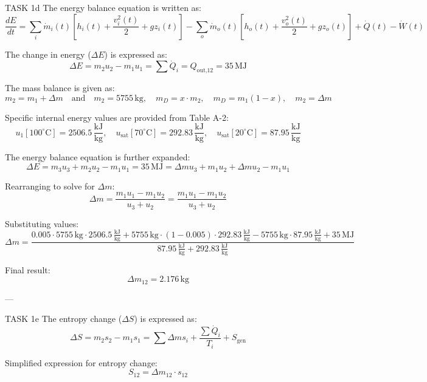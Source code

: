 TASK 1d  
The energy balance equation is written as:  
\[
\frac{dE}{dt} = \sum_i \dot{m}_i(t) \left[ h_i(t) + \frac{v_i^2(t)}{2} + g z_i(t) \right] - \sum_o \dot{m}_o(t) \left[ h_o(t) + \frac{v_o^2(t)}{2} + g z_o(t) \right] + \dot{Q}(t) - \dot{W}(t)
\]  

The change in energy (\( \Delta E \)) is expressed as:  
\[
\Delta E = m_2 u_2 - m_1 u_1 = \sum \dot{Q}_i = Q_{\text{out,12}} = 35 \, \text{MJ}
\]  

The mass balance is given as:  
\[
m_2 = m_1 + \Delta m \quad \text{and} \quad m_2 = 5755 \, \text{kg}, \quad m_D = x \cdot m_2, \quad m_D = m_1 (1 - x), \quad m_2 = \Delta m
\]  

Specific internal energy values are provided from Table A-2:  
\[
u_1 [100^\circ\text{C}] = 2506.5 \, \frac{\text{kJ}}{\text{kg}}, \quad u_{\text{sat}} [70^\circ\text{C}] = 292.83 \, \frac{\text{kJ}}{\text{kg}}, \quad u_{\text{sat}} [20^\circ\text{C}] = 87.95 \, \frac{\text{kJ}}{\text{kg}}
\]  

The energy balance equation is further expanded:  
\[
\Delta E = m_3 u_3 + m_2 u_2 - m_1 u_1 = 35 \, \text{MJ} = \Delta m u_3 + m_1 u_2 + \Delta m u_2 - m_1 u_1
\]  

Rearranging to solve for \( \Delta m \):  
\[
\Delta m = \frac{m_1 u_1 - m_1 u_2}{u_3 + u_2} = \frac{m_1 u_1 - m_1 u_2}{u_3 + u_2}
\]  

Substituting values:  
\[
\Delta m = \frac{0.005 \cdot 5755 \, \text{kg} \cdot 2506.5 \, \frac{\text{kJ}}{\text{kg}} + 5755 \, \text{kg} \cdot (1 - 0.005) \cdot 292.83 \, \frac{\text{kJ}}{\text{kg}} - 5755 \, \text{kg} \cdot 87.95 \, \frac{\text{kJ}}{\text{kg}} + 35 \, \text{MJ}}{87.95 \, \frac{\text{kJ}}{\text{kg}} + 292.83 \, \frac{\text{kJ}}{\text{kg}}}
\]  

Final result:  
\[
\Delta m_{12} = 2.176 \, \text{kg}
\]  

---

TASK 1e  
The entropy change (\( \Delta S \)) is expressed as:  
\[
\Delta S = m_2 s_2 - m_1 s_1 = \sum \Delta m s_i + \frac{\sum \dot{Q}_i}{T_i} + S_{\text{gen}}
\]  

Simplified expression for entropy change:  
\[
S_{12} = \Delta m_{12} \cdot s_{12}
\]